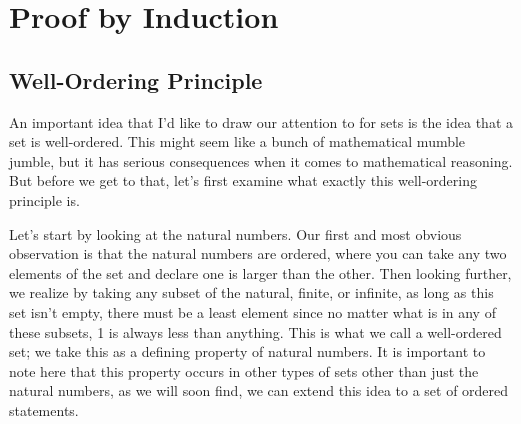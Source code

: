 \documentclass[11pt]{article}
\numberwithin{lemma}{section}
\numberwithin{equation}{section}
\numberwithin{define}{section}
\numberwithin{prop}{section}
\numberwithin{figure}{section}
\numberwithin{theorem}{section}
\newcounter{ex}[section]
\numberwithin{ex}{section}
\begin{document}
\section{Proof by Induction}
\subsection{Well-Ordering Principle}
An important idea that I'd like to draw our attention to for sets is the idea that a set is well-ordered. This might seem like a bunch of mathematical mumble jumble, but it has serious consequences when it comes to mathematical reasoning. But before we get to that, let's first examine what exactly this well-ordering principle is. 

Let's start by looking at the natural numbers. Our first and most obvious observation is that the natural numbers are ordered, where you can take any two elements of the set and declare one is larger than the other. 
Then looking further, we realize by taking any subset of the natural, finite, or infinite, as long as this set isn't empty, there must be a least element since no matter what is in any of these subsets, 1 is always less than anything. This is what we call a well-ordered set; we take this as a defining property of natural numbers. 
It is important to note here that this property occurs in other types of sets other than just the natural numbers, as we will soon find, we can extend this idea to a set of ordered statements.
\end{document}
